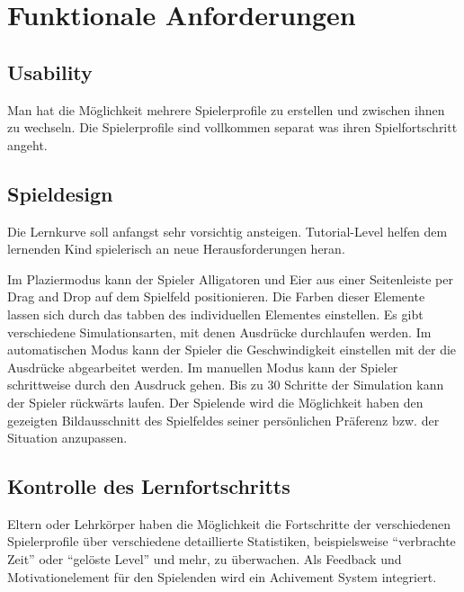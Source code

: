 \section{Funktionale Anforderungen}

\subsection{Usability}

\begin{requirements}
	Man hat die Möglichkeit mehrere Spielerprofile zu erstellen und zwischen ihnen zu wechseln.
	Die Spielerprofile sind vollkommen separat was ihren Spielfortschritt angeht. 
\end{requirements}

\subsection{Spieldesign}

\begin{requirements}
	Die Lernkurve soll anfangst sehr vorsichtig ansteigen. Tutorial-Level helfen dem lernenden Kind spielerisch an neue Herausforderungen heran.
	
	Im Plaziermodus kann der Spieler Alligatoren und Eier aus einer Seitenleiste per Drag and Drop auf dem Spielfeld positionieren. Die Farben dieser Elemente lassen sich durch das tabben des individuellen Elementes einstellen.
	Es gibt verschiedene Simulationsarten, mit denen Ausdrücke durchlaufen werden. Im automatischen Modus kann der Spieler die Geschwindigkeit einstellen mit der die Ausdrücke abgearbeitet werden. Im manuellen Modus kann der Spieler schrittweise durch den Ausdruck gehen. Bis zu 30 Schritte der Simulation kann der Spieler rückwärts laufen.
	Der Spielende wird die Möglichkeit haben den  gezeigten Bildausschnitt des Spielfeldes seiner persönlichen Präferenz bzw. der Situation anzupassen.	

\end{requirements}


\subsection{Kontrolle des Lernfortschritts}

\begin{requirements}
	Eltern oder Lehrkörper haben die Möglichkeit die Fortschritte der verschiedenen Spielerprofile über verschiedene detaillierte Statistiken, beispielsweise ``verbrachte Zeit'' oder ``gelöste Level'' und mehr,  zu überwachen.
	Als Feedback und Motivationelement für den Spielenden wird ein Achivement System integriert.
\end{requirements}

